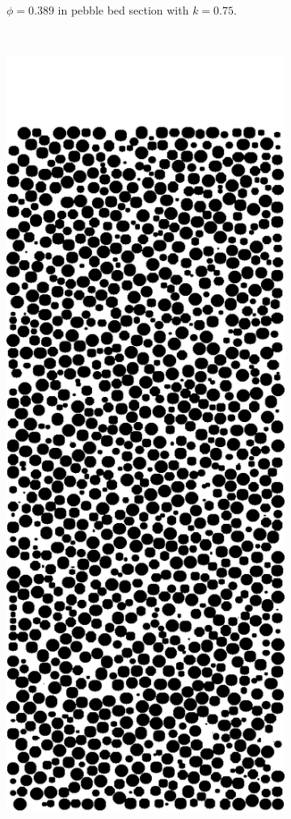 \begin{figure}[h]
\begin{subfigure}[b]{0.2\textwidth}
                \caption{$\phi = 0.389$ in pebble bed section with $k = 0.75$.}
                \label{fig:2d-res20-k075}
        \end{subfigure}%
        ~
        \begin{subfigure}[b]{0.2\textwidth}
                \includegraphics[width=\textwidth]{figures/lbm/2d-res20-k090.png}

\end{subfigure}
\end{figure}
